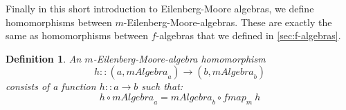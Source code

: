\documentclass{jfp1}
\newtheorem{definition}{Definition}
\begin{document}

Finally in this short introduction to Eilenberg-Moore algebras, we
define homomorphisms between $m$-Eilenberg-Moore-algebras. These are
exactly the same as homomorphisms between $f$-algebras that we defined
in \autoref{sec:f-algebras}.

\begin{definition}
  An \emph{$m$-Eilenberg-Moore-algebra homomorphism}
  \begin{displaymath}
    h :: (a, \mathit{mAlgebra}_a) \to (b, \mathit{mAlgebra}_b)
  \end{displaymath}
  consists of a function $h :: a \to b$ such that:
  \begin{equation}
    \label{eq:em-alg-homomorphism}
    h \circ \mathit{mAlgebra}_a = \mathit{mAlgebra}_b \circ \mathit{fmap}_m~h
  \end{equation}
\end{definition}
\end{document}

